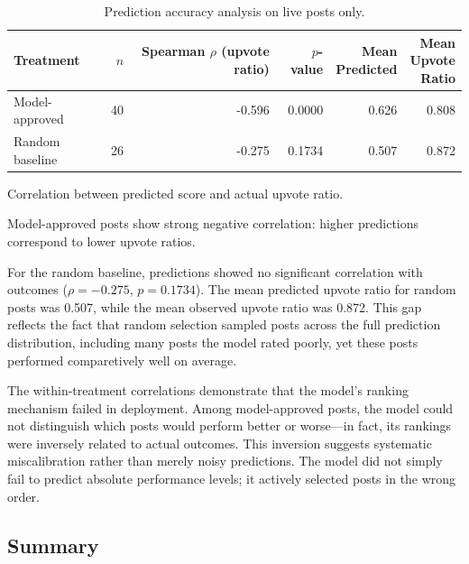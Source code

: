 \begin{table}[htbp]
\centering
\caption{Prediction accuracy analysis on live posts only.}
\label{tab:prediction_accuracy}
\begin{threeparttable}
\begin{tabular}{lrrrrr}
\toprule
Treatment & $n$ & \makecell{Spearman\\$\rho$\\(upvote\\ratio)} & $p$-value & \makecell{Mean\\Predicted} & \makecell{Mean\\Upvote\\Ratio} \\
\midrule
Model-approved & 40 & -0.596 & 0.0000 & 0.626 & 0.808 \\
Random baseline & 26 & -0.275 & 0.1734 & 0.507 & 0.872 \\
\bottomrule
\end{tabular}
\vspace{0.2cm}
\begin{tablenotes}
\small
\item Correlation between predicted score and actual upvote ratio.
\item Model-approved posts show strong negative correlation: higher predictions correspond to lower upvote ratios.
\end{tablenotes}
\end{threeparttable}
\end{table}

For the random baseline, predictions showed no significant correlation with outcomes ($\rho = -0.275$, $p = 0.1734$). The mean predicted upvote ratio for random posts was 0.507, while the mean observed upvote ratio was 0.872. This gap reflects the fact that random selection sampled posts across the full prediction distribution, including many posts the model rated poorly, yet these posts performed comparetively well on average.

The within-treatment correlations demonstrate that the model's ranking mechanism failed in deployment. Among model-approved posts, the model could not distinguish which posts would perform better or worse—in fact, its rankings were inversely related to actual outcomes. This inversion suggests systematic miscalibration rather than merely noisy predictions. The model did not simply fail to predict absolute performance levels; it actively selected posts in the wrong order.

\subsection{Summary}
\label{subsec:live_summary}

